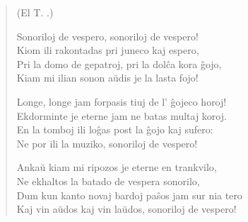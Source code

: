 \begin{verse}
\begin{center}
\footnotesize (El T. .)
\end{center}
            Sonoriloj de vespero, sonoriloj de vespero!\\
            Kiom ili rakontadas pri juneco kaj espero,\\
            Pri la domo de gepatroj, pri la dol\^ca kora \^gojo,\\
            Kiam mi ilian sonon a\u udis je la lasta fojo!

            Longe, longe jam forpasis tiuj de l' \^gojeco horoj!\\
            Ekdorminte je eterne jam ne batas multaj koroj.\\
            En la tomboj ili lo\^gas post la \^gojo kaj sufero:\\
            Ne por ili la muziko, sonoriloj de vespero!

            Anka\u u kiam mi ripozos je eterne en trankvilo,\\
            Ne ekhaltos la batado de vespera sonorilo,\\
            Dum kun kanto novaj bardoj pa\^sos jam sur nia tero\\
            Kaj vin a\u udos kaj vin la\u udos, sonoriloj de vespero!

\end{verse}


\smallrule{}
